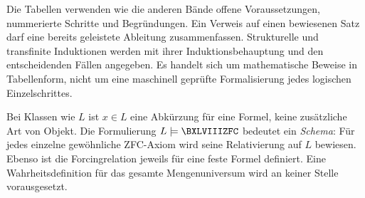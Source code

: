 Die Tabellen verwenden wie die anderen Bände offene Voraussetzungen,
nummerierte Schritte und Begründungen. Ein Verweis auf einen bewiesenen
Satz darf eine bereits geleistete Ableitung zusammenfassen.
Strukturelle und transfinite Induktionen werden mit ihrer
Induktionsbehauptung und den entscheidenden Fällen angegeben.
Es handelt sich um mathematische Beweise in Tabellenform, nicht um eine
maschinell geprüfte Formalisierung jedes logischen Einzelschrittes.

Bei Klassen wie \(L\) ist \(x\in L\) eine Abkürzung für eine Formel, keine
zusätzliche Art von Objekt. Die Formulierung \(L\models\BXLVIIIZFC\)
bedeutet ein \emph{Schema}: Für jedes einzelne gewöhnliche ZFC-Axiom wird
seine Relativierung auf \(L\) bewiesen. Ebenso ist die Forcingrelation
jeweils für eine feste Formel definiert. Eine Wahrheitsdefinition für das
gesamte Mengenuniversum wird an keiner Stelle vorausgesetzt.
